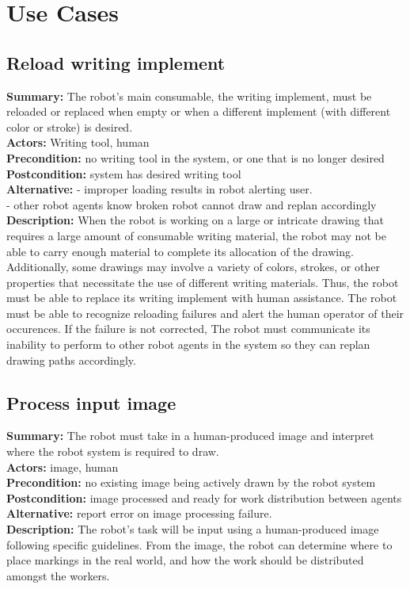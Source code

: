 
\section{Use Cases}
\label{sec:use_cases}

\subsection{Reload writing implement}
\textbf{Summary:} The robot's main consumable, the writing implement, must be reloaded or replaced when empty or when a different implement (with different color or stroke) is desired. \\
\textbf{Actors:}  Writing tool, human \\
\textbf{Precondition:} no writing tool in the system, or one that is no longer desired \\
\textbf{Postcondition:} system has desired writing tool \\
\textbf{Alternative:} - improper loading results in robot alerting user. \\
             - other robot agents know broken robot cannot draw and replan accordingly \\
\textbf{Description:} When the robot is working on a large or intricate drawing that requires a large amount of consumable writing material, the robot may not be able to carry enough material to complete its allocation of the drawing. Additionally, some drawings may involve a variety of colors, strokes, or other properties that necessitate the use of different writing materials. Thus, the robot must be able to replace its writing implement with human assistance. The robot must be able to recognize reloading failures and alert the human operator of their occurences. If the failure is not corrected, The robot must communicate its inability to perform to other robot agents in the system so they can replan drawing paths accordingly. \\

\subsection{Process input image}
\textbf{Summary:} The robot must take in a human-produced image and interpret where the robot system is required to draw. \\
\textbf{Actors:} image, human \\
\textbf{Precondition:}  no existing image being actively drawn by the robot system \\
\textbf{Postcondition:} image processed and ready for work distribution between agents \\
\textbf{Alternative:} report error on image processing failure. \\
\textbf{Description:} The robot's task will be input using a human-produced image following specific guidelines. From the image, the robot can determine where to place markings in the real world, and how the work should be distributed amongst the workers. \\

